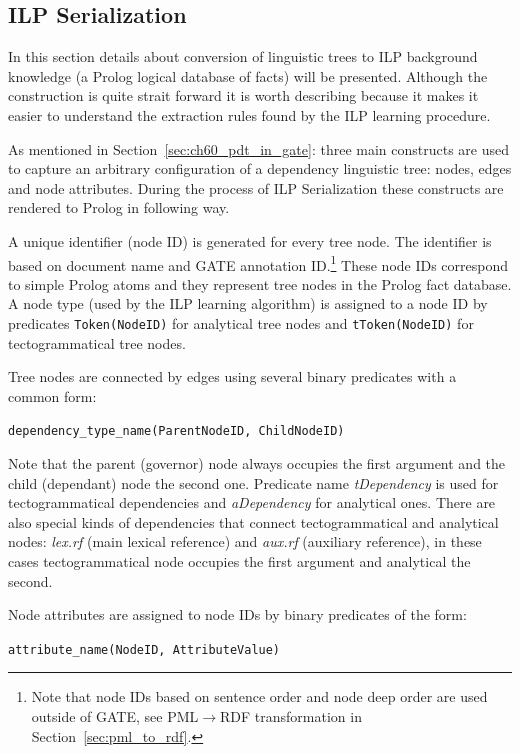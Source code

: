 \subsection{ILP Serialization} \label{sec:ilp_serialization} \label{sec:impl_ilp_serialization}

In this section details about conversion of linguistic trees to ILP background knowledge (a Prolog logical database of facts) will be presented. Although the construction is quite strait forward it is worth describing because it makes it easier to understand the extraction rules found by the ILP learning procedure. 

As mentioned in Section~\ref{sec:ch60_pdt_in_gate}: three main constructs are used to capture an arbitrary configuration of a dependency linguistic tree: nodes, edges and node attributes. During the process of ILP Serialization these constructs are rendered to Prolog in following way. 

A unique identifier (node ID) is generated for every tree node. The identifier is based on document name and GATE annotation ID.\footnote{Note that node IDs based on sentence order and node deep order are used outside of GATE, see PML$\rightarrow$RDF transformation in Section~\ref{sec:pml_to_rdf}.} These node IDs correspond to simple Prolog atoms and they represent tree nodes in the Prolog fact database. A node type (used by the ILP learning algorithm) is assigned to a node ID by predicates \texttt{Token(NodeID)} for analytical tree nodes and \texttt{tToken(NodeID)} for tectogrammatical tree nodes.

Tree nodes are connected by edges using several binary predicates with a common form:

\texttt{dependency\_type\_name(ParentNodeID, ChildNodeID)}

\noindent Note that the parent (governor) node always occupies the first argument and the child (dependant) node the second one. Predicate name \emph{tDependency} is used for tectogrammatical dependencies and \emph{aDependency} for analytical ones. There are also special kinds of dependencies that connect tectogrammatical and analytical nodes: \emph{lex.rf} (main lexical reference) and \emph{aux.rf} (auxiliary reference), in these cases tectogrammatical node occupies the first argument and analytical the second.

Node attributes are assigned to node IDs by binary predicates of the form:

\texttt{attribute\_name(NodeID, AttributeValue)}

